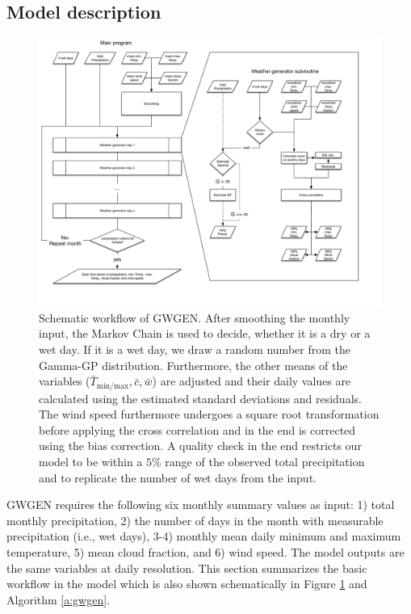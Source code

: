 \begin{refsection}
\section{Model description} \label{sec:model}
\begin{figure}
	\includegraphics[width=\linewidth]{gwgen-figures/f01.pdf}
	\caption[Schematic workflow of GWGEN]{Schematic workflow of GWGEN. After smoothing the monthly input, the Markov Chain is used to decide, whether it is a dry or a wet day. If it is a wet day, we draw a random number from the Gamma-GP distribution. Furthermore, the other means of the variables ($\bar{T}_\mathrm{min/max}, \bar{c}, \bar{w}$) are adjusted and their daily values are calculated using the estimated standard deviations and residuals. The wind speed furthermore undergoes a square root transformation before applying the cross correlation and in the end is corrected using the bias correction. A quality check in the end restricts our model to be within a $5\%$ range of the observed total precipitation and to replicate the number of wet days from the input.}
	\label{fig:schema}
\end{figure}
GWGEN requires the following six monthly summary values as input: 1) total monthly precipitation, 2) the number of days in the month with measurable precipitation (i.e., wet days), 3-4) monthly mean daily minimum and maximum temperature, 5) mean cloud fraction, and 6) wind speed. The model outputs are the same variables at daily resolution. This section summarizes the basic workflow in the model which is also shown schematically in Figure \ref{fig:schema} and Algorithm \autoref{a:gwgen}.


\end{refsection}
